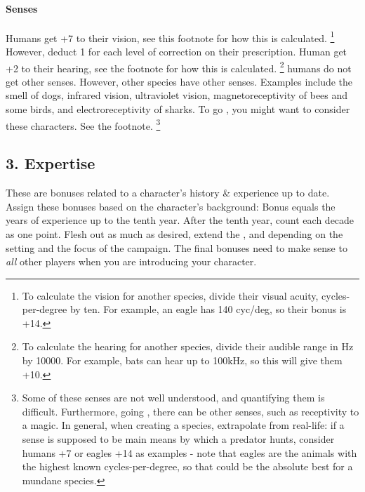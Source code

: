 \documentclass{LegrandOrangeTufteBook}
\begin{document}
\paragraph*{Senses}
Humans get +7 to their vision, see this footnote for how this is calculated.
\footnote{
	To calculate the vision for another species, divide their visual acuity, cycles-per-degree by ten.
	For example, an eagle has 140 cyc/deg, so their bonus is +14.
}
However, deduct 1 for each level of correction on their prescription.
Human get +2 to their hearing, see the footnote for how this is calculated.
\footnote{
	To calculate the hearing for another species, divide their audible range in Hz by 10000.
	For example, bats can hear up to 100kHz, so this will give them +10.
}
 humans do not get other senses.
However, other species have other senses.
Examples include the smell of dogs, infrared vision, ultraviolet vision,
magnetoreceptivity of bees and some birds, and electroreceptivity of sharks.
To go , you might want to consider these characters.
See the footnote.
\footnote{
	Some of these senses are not well understood, and quantifying them is difficult.
	Furthermore, going , there can be other senses,
	such as receptivity to a magic.
	In general, when creating a species, extrapolate from real-life:
	if a sense is supposed to be main means by which a predator
	hunts, consider humans +7 or eagles +14 as examples - note that eagles
	are the animals with the highest known cycles-per-degree, so that
	could be the absolute best for a mundane species.
}




\subsection*{3. Expertise}

These are bonuses related to a character's history \& experience up to date.
Assign these bonuses based on the character's background:
Bonus equals the years of experience up to the tenth year.
After the tenth year, count each decade as one point.
Flesh out as much as desired, extend the ,  and  depending on the setting and the focus of the campaign.
The final bonuses need to make sense to \emph{all} other players when you are introducing your character.\\
\end{document}
